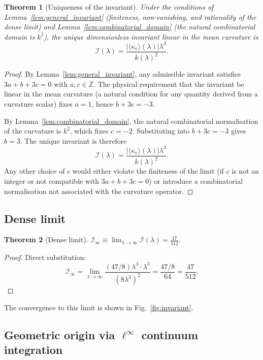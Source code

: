 \documentclass[aps,pre,onecolumn,10pt,groupedaddress,amsmath,amssymb,floatfix]{revtex4-2}
\newtheorem{theorem}{Theorem}
\begin{document}
\begin{theorem}[Uniqueness of the invariant]
\label{thm:uniqueness}
Under the conditions of Lemma~\ref{lem:general_invariant} (finiteness, non-vanishing, and rationality of the dense limit) and Lemma~\ref{lem:combinatorial_domain} (the natural combinatorial domain is $k^2$), the unique dimensionless invariant linear in the mean curvature is
\begin{equation}
\mathcal{I}(\lambda) = \frac{|\langle\kappa_e\rangle(\lambda)| \lambda^3}{k(\lambda)^2}.
\label{eq:invariant}
\end{equation}
\end{theorem}
\begin{proof}
By Lemma~\ref{lem:general_invariant}, any admissible invariant satisfies $3a + b + 3c = 0$ with $a, c \in \mathbb{Z}$. The physical requirement that the invariant be linear in the mean curvature (a natural condition for any quantity derived from a curvature scalar) fixes $a = 1$, hence $b + 3c = -3$.

By Lemma~\ref{lem:combinatorial_domain}, the natural combinatorial normalisation of the curvature is $k^2$, which fixes $c = -2$. Substituting into $b + 3c = -3$ gives $b = 3$. The unique invariant is therefore
\[
\mathcal{I}(\lambda) = \frac{|\langle\kappa_e\rangle(\lambda)| \lambda^{3}}{k(\lambda)^{2}}.
\]
Any other choice of $c$ would either violate the finiteness of the limit (if $c$ is not an integer or not compatible with $3a + b + 3c = 0$) or introduce a combinatorial normalisation not associated with the curvature operator.
\end{proof}

\subsection{Dense limit}

\begin{theorem}[Dense limit]
\label{thm:dense}
$\displaystyle \mathcal{I}_\infty \equiv \lim_{\lambda\to\infty} \mathcal{I}(\lambda) = \frac{47}{512}$.
\end{theorem}
\begin{proof}
Direct substitution:
\[
\mathcal{I}_\infty = \lim_{\lambda\to\infty}\frac{(47/8)\lambda^3\cdot\lambda^3}{(8\lambda^3)^2} = \frac{47/8}{64} = \frac{47}{512}.
\]
\end{proof}

The convergence to this limit is shown in Fig.~\ref{fig:invariant}.

\subsection{Geometric origin via $\ell^\infty$ continuum integration}
\end{document}
